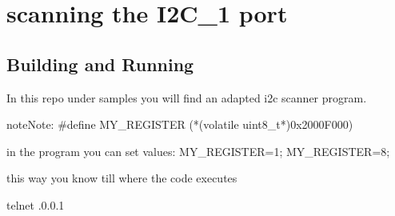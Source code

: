 \documentclass[letterpaper,10pt,english]{sphinxmanual}
\begin{document}
\section{scanning the I2C\_1 port}
\label{\detokenize{hacking/i2cscanning:scanning-the-i2c-1-port}}\label{\detokenize{hacking/i2cscanning:i2cscanning}}\label{\detokenize{hacking/i2cscanning::doc}}
\begin{sphinxVerbatim}[commandchars=\\\{\}]
       
       
              
        
\end{sphinxVerbatim}


\subsection{Building and Running}
\label{\detokenize{hacking/i2cscanning:building-and-running}}
In this repo under samples you will find an adapted i2c scanner program.

\begin{sphinxVerbatim}[commandchars=\\\{\}]
\end{sphinxVerbatim}

\begin{sphinxadmonition}{note}{Note:}
\#define MY\_REGISTER (*(volatile uint8\_t*)0x2000F000)

in the program you can set values:
MY\_REGISTER=1;
MY\_REGISTER=8;

this way you know till where the code executes
\end{sphinxadmonition}

\begin{sphinxVerbatim}[commandchars=\\\{\}]
telnet .0.0.1 
\end{sphinxVerbatim}
\end{document}
